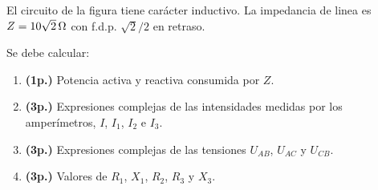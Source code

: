 \documentclass[12pt]{article}
\begin{document}
\begin{enumerate}[resume]







El circuito de la figura tiene carácter inductivo.  La impedancia de
linea es $Z=\SI[parse-numbers=false]{10\sqrt{2}}{\ohm}$ con
f.d.p. $\sqrt{2}/2$ en retraso. 

Se debe calcular:

\begin{enumerate}

\item \textbf{(1p.)} Potencia activa y reactiva consumida por $Z$.

\item  \textbf{(3p.)} Expresiones complejas de las intensidades medidas por los
  amperímetros, $I$, $I_1$, $I_2$ e $I_3$. 

\item  \textbf{(3p.)} Expresiones complejas de las tensiones $U_{AB}$, $U_{AC}$ y
  $U_{CB}$.

\item  \textbf{(3p.)} Valores de $R_1$, $X_1$, $R_2$, $R_3$ y $X_3$.

\end{enumerate}


\end{enumerate}
\end{document}
